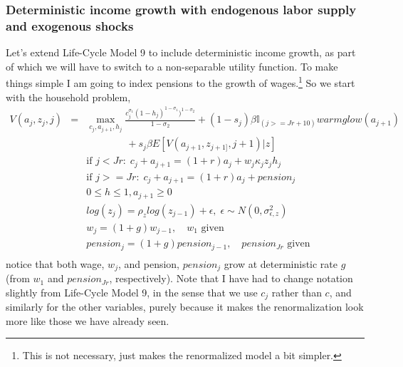\subsubsection{Deterministic income growth with endogenous labor supply and exogenous shocks}
Let's extend Life-Cycle Model 9 to include deterministic income growth, as part of which we will have to switch to a non-separable utility function. To make things simple I am going to index pensions to the growth of wages.\footnote{This is not necessary, just makes the renormalized model a bit simpler.} So we start with the household problem,
\begin{eqnarray*}
 V(a_j,z_j,j)&=& \max_{c_j,a_{j+1},h_j} \frac{c_j^{\sigma_1} (1-h_j)^{1-\sigma_1})^{1-\sigma_2}}{1-\sigma_2} + (1-s_j)\beta  \mathbb{I}_{(j>=Jr+10)} warmglow(a_{j+1})   \\
 && \quad \quad  \quad \quad  + s_j \beta E[V(a_{j+1},z_{j+1]},j+1)|z] \\
&& \text{if }j<Jr: \; c_j+a_{j+1}=(1+r)a_j+w_j \kappa_j z_j h_j\\
&& \text{if }j>=Jr: \; c_j+a_{j+1}=(1+r)a_j +pension_j\\
&& 0\leq h \leq 1, a_{j+1} \geq 0 \\
&& log(z_j)=\rho_z log(z_{j-1}) + \epsilon, \; \epsilon \sim N(0,\sigma_{\epsilon,z}^2) \\
&& w_j=(1+g)w_{j-1}, \quad w_1\text{ given} \\
&& pension_j=(1+g)pension_{j-1}, \quad pension_{Jr}\text{ given} \\
\end{eqnarray*}
notice that both wage, $w_j$, and pension, $pension_j$ grow at deterministic rate $g$ (from $w_1$ and $pension_{Jr}$, respectively). Note that I have had to change notation slightly from Life-Cycle Model 9, in the sense that we use $c_j$ rather than $c$, and similarly for the other variables, purely because it makes the renormalization look more like those we have already seen.

